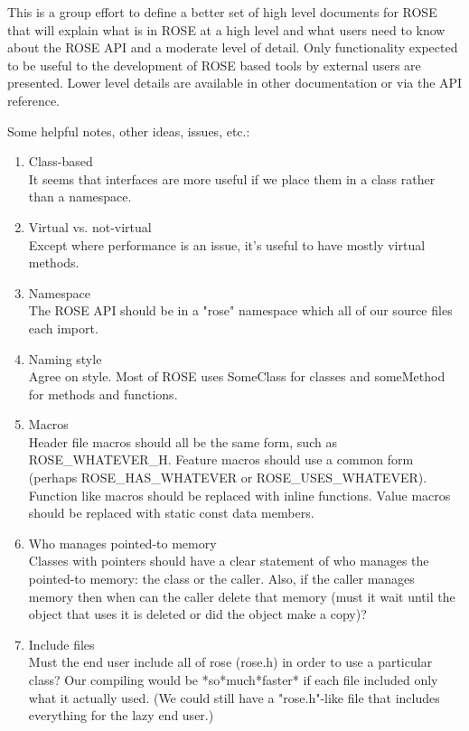     This is a group effort to define a better set of high level documents for ROSE
that will explain what is in ROSE at a high level and what users need to know about the
ROSE API and a moderate level of detail.  Only functionality expected to be useful to the
development of ROSE based tools by external users are presented.  Lower level details are
available in other documentation or via the API reference.

Some helpful notes, other ideas, issues, etc.:
\begin{enumerate}
   \item Class-based \\
	It seems that interfaces are more useful if we place them in a
	class rather than a namespace.

   \item Virtual vs. not-virtual \\
	Except where performance is an issue, it's useful to have
	mostly virtual methods.

   \item Namespace \\
	The ROSE API should be in a "rose" namespace which all of our
	source files each import.

   \item Naming style \\
	Agree on style. Most of ROSE uses SomeClass for classes and
	someMethod for methods and functions.

   \item Macros \\
	Header file macros should all be the same form, such as
	ROSE\_WHATEVER\_H.  Feature macros should use a common form
	(perhaps ROSE\_HAS\_WHATEVER or ROSE\_USES\_WHATEVER). Function
	like macros should be replaced with inline functions. Value
	macros should be replaced with static const data members.

   \item Who manages pointed-to memory \\
	Classes with pointers should have a clear statement of who
	manages the pointed-to memory: the class or the caller. Also,
	if the caller manages memory then when can the caller delete
	that memory (must it wait until the object that uses it is
	deleted or did the object make a copy)?

   \item Include files \\
	Must the end user include all of rose (rose.h) in order to use
	a particular class?  Our compiling would be *so*much*faster*
	if each file included only what it actually used. (We could
	still have a "rose.h"-like file that includes everything for
	the lazy end user.)


\end{enumerate}

